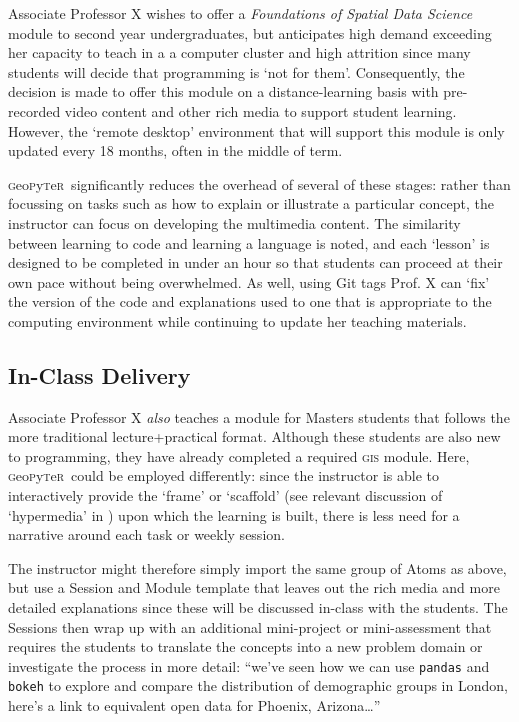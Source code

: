\documentclass[letter, 11pt,titlepage]{article}
\newcommand{\gp}{\textsc{g}eo\textsc{p}y\textsc{t}e\textsc{r}~\/}
\begin{document}
Associate Professor X wishes to offer a \emph{Foundations of Spatial Data Science} module to second year undergraduates, but anticipates high demand exceeding her capacity to teach in a a computer cluster and high attrition since many students will decide that programming is `not for them'. Consequently, the decision is made to offer this module on a distance-learning basis with pre-recorded video content and other rich media to support student learning. However, the `remote desktop' environment that will support this module is only updated every 18 months, often in the middle of term.

\gp significantly reduces the overhead of several of these stages: rather than focussing on tasks such as how to explain or illustrate a particular concept, the instructor can focus on developing the multimedia content. The similarity between learning to code and learning a language is noted, and each `lesson' is designed to be completed in under an hour so that students can proceed at their own pace without being overwhelmed. As well, using Git tags Prof. X can `fix' the version of the code and explanations used to one that is appropriate to the computing environment while continuing to update her teaching materials.

\subsection{In-Class Delivery}\label{in-class-delivery}

Associate Professor X \emph{also} teaches a module for Masters students that follows the more traditional lecture+practical format. Although these students are also new to programming, they have already completed a required \textsc{gis} module. Here, \gp could be employed differently: since the instructor is able to interactively provide the `frame' or `scaffold' (see relevant discussion of `hypermedia' in \citealp{Azevedo2008}) upon which the learning is built, there is less need for a narrative around each task or weekly session. 

The instructor might therefore simply import the same group of Atoms as above, but use a Session and Module template that leaves out the rich media and more detailed explanations since these will be discussed in-class with the students. The Sessions then wrap up with an additional mini-project or mini-assessment that requires the students to translate the concepts into a new problem domain or investigate the process in more detail: ``we've seen how we can use \texttt{pandas} and \texttt{bokeh} to explore and compare the distribution of demographic groups in London, here's a link to equivalent open data for Phoenix, Arizona\ldots{}'' 
\end{document}
